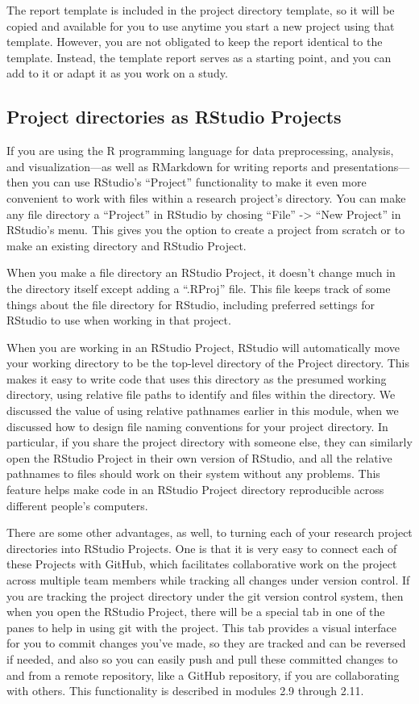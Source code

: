 \documentclass[]{tufte-book}
\begin{document}
The report template is included in the project directory template, so it will be
copied and available for you to use anytime you start a new project using that
template. However, you are not obligated to keep the report identical to the
template. Instead, the template report serves as a starting point, and you can
add to it or adapt it as you work on a study.

\subsection{Project directories as RStudio Projects}\label{project-directories-as-rstudio-projects}

If you are using the R programming language for data preprocessing, analysis,
and visualization---as well as RMarkdown for writing reports and
presentations---then you can use RStudio's ``Project'' functionality to make it
even more convenient to work with files within a research project's directory.
You can make any file directory a ``Project'' in RStudio by chosing ``File'' -\textgreater{}
``New Project'' in RStudio's menu. This gives you the option to create a
project from scratch or to make an existing directory and RStudio Project.

When you make a file directory an RStudio Project, it doesn't change much in
the directory itself except adding a ``.RProj'' file. This file keeps track of
some things about the file directory for RStudio, including preferred settings
for RStudio to use when working in that project.

When you are working in an RStudio Project, RStudio will automatically move your
working directory to be the top-level directory of the Project directory. This
makes it easy to write code that uses this directory as the presumed working
directory, using relative file paths to identify and files within the directory.
We discussed the value of using relative pathnames earlier in this module, when
we discussed how to design file naming conventions for your project directory.
In particular, if you share the project directory with someone else, they can
similarly open the RStudio Project in their own version of RStudio, and all the
relative pathnames to files should work on their system without any problems.
This feature helps make code in an RStudio Project directory reproducible across
different people's computers.

There are some other advantages, as well, to turning each of your research
project directories into RStudio Projects. One is that it is very easy to
connect each of these Projects with GitHub, which facilitates collaborative work
on the project across multiple team members while tracking all changes under
version control. If you are tracking the project directory under the git version
control system, then when you open the RStudio Project, there will be a special
tab in one of the panes to help in using git with the project. This tab provides
a visual interface for you to commit changes you've made, so they are tracked
and can be reversed if needed, and also so you can easily push and pull these
committed changes to and from a remote repository, like a GitHub repository, if
you are collaborating with others. This functionality is described in modules
2.9 through 2.11.
\end{document}
